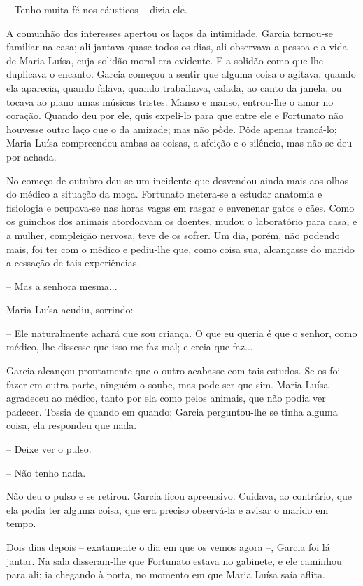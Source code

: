 -- Tenho muita fé nos cáusticos -- dizia ele.

A comunhão dos interesses apertou os laços da intimidade. Garcia
tornou-se familiar na casa; ali jantava quase todos os dias, ali
observava a pessoa e a vida de Maria Luísa, cuja solidão moral era
evidente. E a solidão como que lhe duplicava o encanto. Garcia começou a
sentir que alguma coisa o agitava, quando ela aparecia, quando falava,
quando trabalhava, calada, ao canto da janela, ou tocava ao piano umas
músicas tristes. Manso e manso, entrou-lhe o amor no coração. Quando deu
por ele, quis expeli-lo para que entre ele e Fortunato não houvesse
outro laço que o da amizade; mas não pôde. Pôde apenas trancá-lo; Maria
Luísa compreendeu ambas as coisas, a afeição e o silêncio, mas não se
deu por achada.

No começo de outubro deu-se um incidente que desvendou ainda mais aos
olhos do médico a situação da moça. Fortunato metera-se a estudar
anatomia e fisiologia e ocupava-se nas horas vagas em rasgar e envenenar
gatos e cães. Como os guinchos dos animais atordoavam os doentes, mudou
o laboratório para casa, e a mulher, compleição nervosa, teve de os
sofrer. Um dia, porém, não podendo mais, foi ter com o médico e
pediu-lhe que, como coisa sua, alcançasse do marido a cessação de tais
experiências.

-- Mas a senhora mesma...

Maria Luísa acudiu, sorrindo:

-- Ele naturalmente achará que sou criança. O que eu queria é que o
senhor, como médico, lhe dissesse que isso me faz mal; e creia que
faz...

Garcia alcançou prontamente que o outro acabasse com tais estudos. Se os
foi fazer em outra parte, ninguém o soube, mas pode ser que sim. Maria
Luísa agradeceu ao médico, tanto por ela como pelos animais, que não
podia ver padecer. Tossia de quando em quando; Garcia perguntou-lhe se
tinha alguma coisa, ela respondeu que nada.

-- Deixe ver o pulso.

-- Não tenho nada.

Não deu o pulso e se retirou. Garcia ficou apreensivo. Cuidava, ao
contrário, que ela podia ter alguma coisa, que era preciso observá-la e
avisar o marido em tempo.

Dois dias depois -- exatamente o dia em que os vemos agora --, Garcia
foi lá jantar. Na sala disseram-lhe que Fortunato estava no gabinete, e
ele caminhou para ali; ia chegando à porta, no momento em que Maria
Luísa saía aflita.

